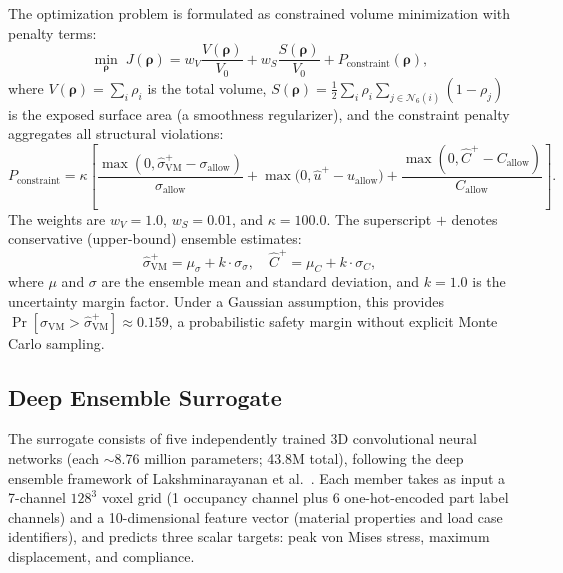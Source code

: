 \documentclass[11pt]{article}
\theoremstyle{plain}
\theoremstyle{definition}
\theoremstyle{remark}
\begin{document}
The optimization problem is formulated as constrained volume minimization with penalty terms:
\begin{equation}\label{eq:objective}
\min_{\boldsymbol{\rho}}\;J(\boldsymbol{\rho}) = w_V \frac{V(\boldsymbol{\rho})}{V_0} + w_S \frac{S(\boldsymbol{\rho})}{V_0} + P_{\mathrm{constraint}}(\boldsymbol{\rho}),
\end{equation}
where $V(\boldsymbol{\rho}) = \sum_{i} \rho_i$ is the total volume, $S(\boldsymbol{\rho}) = \frac{1}{2}\sum_{i}\rho_i\sum_{j\in\mathcal{N}_6(i)}(1-\rho_j)$ is the exposed surface area (a smoothness regularizer), and the constraint penalty aggregates all structural violations:
\begin{equation}\label{eq:penalty}
P_{\mathrm{constraint}} = \kappa\left[\frac{\max(0, \hat{\sigma}^+_{\mathrm{VM}} - \sigma_{\mathrm{allow}})}{\sigma_{\mathrm{allow}}} + \max\!\bigl(0, \hat{u}^+ - u_{\mathrm{allow}}\bigr) + \frac{\max(0, \hat{C}^+ - C_{\mathrm{allow}})}{C_{\mathrm{allow}}}\right].
\end{equation}
The weights are $w_V = 1.0$, $w_S = 0.01$, and $\kappa = 100.0$. The superscript $+$ denotes conservative (upper-bound) ensemble estimates:
\begin{equation}\label{eq:conservative}
\hat{\sigma}^+_{\mathrm{VM}} = \mu_\sigma + k\cdot\sigma_\sigma, \quad \hat{C}^+ = \mu_C + k\cdot\sigma_C,
\end{equation}
where $\mu$ and $\sigma$ are the ensemble mean and standard deviation, and $k = 1.0$ is the uncertainty margin factor. Under a Gaussian assumption, this provides $\Pr[\sigma_{\mathrm{VM}} > \hat{\sigma}^+_{\mathrm{VM}}] \approx 0.159$, a probabilistic safety margin without explicit Monte Carlo sampling.

\subsection{Deep Ensemble Surrogate}
\label{sec:surrogate}

The surrogate consists of five independently trained 3D convolutional neural networks (each $\sim$8.76 million parameters; 43.8M total), following the deep ensemble framework of Lakshminarayanan et al.\ \cite{lakshminarayanan2017}. Each member takes as input a 7-channel $128^3$ voxel grid (1 occupancy channel plus 6 one-hot-encoded part label channels) and a 10-dimensional feature vector (material properties and load case identifiers), and predicts three scalar targets: peak von Mises stress, maximum displacement, and compliance.
\end{document}
